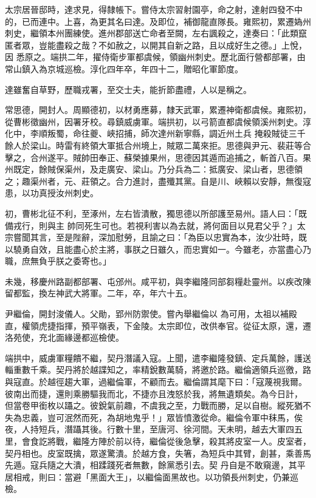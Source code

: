\begin{pinyinscope}
 太宗居晉邸時，達求見，得隸帳下。嘗侍太宗習射園亭，命之射，達射四發不中的，已而連中。上喜，為更其名曰達。及即位，補御龍直隊長。雍熙初，累遷媯州刺史，繼領本州團練使。進州郡部送亡命者至闕，左右諷殺之，達奏曰：「此類竄匿者眾，豈能盡殺之哉？不如赦之，以開其自新之路，且以成好生之德。」上悅，因
 悉原之。端拱二年，擢侍衛步軍都虞候，領幽州刺史。歷北面行營都部署，由常山鎮入為京城巡檢。淳化四年卒，年四十二，贈昭化軍節度。



 達雖奮自草野，歷職戎署，至交士夫，能折節盡禮，人以是稱之。



 常思德，開封人。周顯德初，以材勇應募，隸天武軍，累遷神衛都虞候。雍熙初，從曹彬徵幽州，因署牙校。尋鎮威虜軍。端拱初，以弓箭直都虞候領溪州刺史。淳化中，李順叛蜀，命往夔、峽招捕，師次達州新寧縣，調近州土兵
 掩殺賊徒三千餘人於梁山。時雷有終領大軍抵合州境上，賊眾二萬來拒。思德與尹元、裴莊等合擊之，合州遂平。賊帥田奉正、蘇榮據果州，思德因其遁而追捕之，斬首八百。果州既定，餘賊保渠州，及走廣安、梁山。乃分兵為二：抵廣安、梁山者，思德領之；趣渠州者，元、莊領之。合力進討，盡殲其黨。自是川、峽賴以安靜，無復寇患，以功真授汝州刺史。



 初，曹彬北征不利，至涿州，左右皆潰散，獨思德以所部護至易州。語人曰：「既備戎行，則與主
 帥同死生可也。若視利害以為去就，將何面目以見君父乎？」太宗嘗聞其言，至是陛辭，深加慰勞，且諭之曰：「為臣以忠實為本，汝少壯時，既以驍勇自效，且能盡心於主將，事朕之日雖久，而忠實如一。今雖老，亦當盡心乃職，庶無負乎朕之委寄也。」



 未幾，移慶州路副都部署、屯邠州。咸平初，與李繼隆同部芻糧赴靈州。以疾改陳留都監，換左神武大將軍。二年，卒，年六十五。



 尹繼倫，開封浚儀人。父勛，郢州防禦使。嘗內舉繼倫以
 為可用，太祖以補殿直，權領虎捷指揮，預平嶺表，下金陵。太宗即位，改供奉官。從征太原，還，遷洛苑使，充北面緣邊都巡檢使。



 端拱中，威虜軍糧饋不繼，契丹潛議入寇。上聞，遣李繼隆發鎮、定兵萬餘，護送輜重數千乘。契丹將於越諜知之，率精銳數萬騎，將邀於路。繼倫適領兵巡徼，路與寇直。於越徑趨大軍，過繼倫軍，不顧而去。繼倫謂其麾下曰：「寇蔑視我爾。彼南出而捷，還則乘勝驅我而北，不捷亦且洩怒於我，將無遺類矣。為今日計，
 但當卷甲銜枚以躡之。彼銳氣前趣，不虞我之至，力戰而勝，足以自樹。縱死猶不失為忠義，豈可泯然而死，為胡地鬼乎！」眾皆憤激從命。繼倫令軍中秣馬，俟夜，人持短兵，潛躡其後。行數十里，至唐河、徐河間。天未明，越去大軍四五里，會食訖將戰，繼隆方陣於前以待，繼倫從後急擊，殺其將皮室一人。皮室者，契丹相也。皮室既擒，眾遂驚潰。於越方食，失箸，為短兵中其臂，創甚，乘善馬先遁。寇兵隨之大潰，相蹂踐死者無數，餘黨悉引去。契
 丹自是不敢窺邊，其平居相戒，則曰：當避「黑面大王」，以繼倫面黑故也。以功領長州刺史，仍兼巡檢。




\end{pinyinscope}
